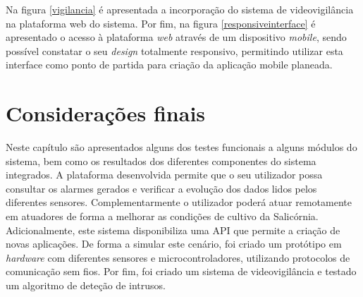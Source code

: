 \newpage

Na figura \ref{vigilancia} é apresentada a incorporação do sistema de videovigilância na plataforma web do sistema. Por fim, na figura \ref{responsiveinterface} é apresentado o acesso à plataforma \textit{web} através de um dispositivo \textit{mobile}, sendo possível constatar o seu \textit{design} totalmente responsivo, permitindo utilizar esta interface como ponto de partida para criação da aplicação mobile planeada. 




\section{Considerações finais}



Neste capítulo são apresentados alguns dos testes funcionais a alguns módulos do sistema, bem como os resultados dos diferentes componentes do sistema integrados.  A plataforma desenvolvida permite que o seu utilizador possa consultar os alarmes gerados e verificar a evolução dos dados lidos pelos diferentes sensores. Complementarmente o utilizador poderá atuar remotamente em atuadores de forma a melhorar as condições de cultivo da Salicórnia. Adicionalmente, este sistema disponibiliza uma API que permite a criação de novas aplicações. De forma a simular este cenário, foi criado um protótipo em \textit{hardware} com diferentes sensores e microcontroladores, utilizando protocolos de comunicação sem fios. Por fim, foi criado um sistema de videovigilância e testado um algoritmo de deteção de intrusos. 


